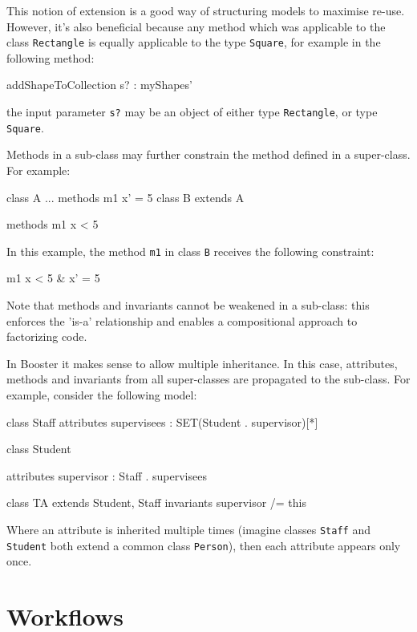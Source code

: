 This notion of extension is a good way of structuring models to
maximise re-use.  However, it's also beneficial because any method
which was applicable to the class \verb|Rectangle| is equally
applicable to the type \verb|Square|, for example in the following
method:

\begin{code}
addShapeToCollection { s? : myShapes' }
\end{code}

the input parameter \verb|s?| may be an object of either type
\verb|Rectangle|, or type \verb|Square|.

Methods in a sub-class may further constrain the method defined in a
super-class.  For example:

\begin{code}
class A {
  ...
  methods
    m1 { x' = 5 }
}
class B extends A {

  methods
    m1 { x < 5 }
}
\end{code}

In this example, the method \verb|m1| in class \verb|B| receives the
following constraint:

\begin{code}
    m1 { x < 5 & x' = 5 }
\end{code}

Note that methods and invariants cannot be weakened in a sub-class:
this enforces the 'is-a' relationship and enables a compositional
approach to factorizing code.

In Booster it makes sense to allow multiple inheritance.  In this
case, attributes, methods and invariants from all super-classes are
propagated to the sub-class.  For example, consider the following
model:

\begin{code}
class Staff {
  attributes
    supervisees : SET(Student . supervisor)[*]
}

class Student {
  attributes
    supervisor : Staff . supervisees

}

class TA extends Student, Staff {
  invariants
    supervisor /= this
}
\end{code}

Where an attribute is inherited multiple times (imagine classes
\verb|Staff| and \verb|Student| both extend a common class
\verb|Person|), then each attribute appears only once.



\section{Workflows}


